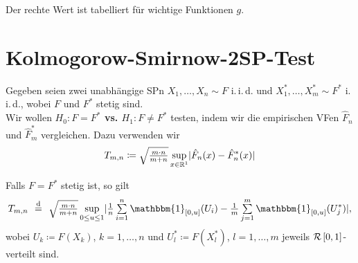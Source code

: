 \documentclass{cheat-sheet}
\newcommand{\E}{\mathbb{E}} %
\newcommand{\ind}{\mathbbm{1}} %
\DeclareMathOperator*{\eqqd}{\stackrel{d}{=}} %
\newcommand{\iid}{i.\,i.\,d.} %
\newcommand{\Uniform}{\mathcal{R}} %
\DeclareMathOperator{\var}{Var} %
\newcommand{\testh}[1]{\textcolor{TestColor}{\textbf{#1}}}
\newcommand{\Normal}{\mathcal{N}} %
\begin{document}
\begin{bem}
  Der rechte Wert ist tabelliert für wichtige Funktionen $g$.
\end{bem}

\section{Kolmogorow-Smirnow-2SP-Test}

\begin{situation}
  Gegeben seien zwei unabhängige SPn $X_1, \ldots, X_n \sim F$ \iid{} und $X_1^*, \ldots, X_m^* \sim F^*$ \iid{}, wobei $F$ und $F^*$ stetig sind. \\
  Wir wollen \testh{$H_0 : F = F^*$ vs. $H_1 : F \neq F^*$} testen, indem wir die empirischen VFen $\hat{F}_n$ und $\hat{F}_m^*$ vergleichen.
  Dazu verwenden wir
  \[ T_{m,n} \coloneqq \sqrt{\tfrac{m \cdot n}{m + n}} \sup_{x \in \mathbb{R}^1} \lvert\hat{F}_n(x) - \hat{F}_n^*(x)\rvert \]
\end{situation}

\begin{satz}
  Falls $F = F^*$ stetig ist, so gilt
  \[ T_{m,n} \enspace\eqqd\enspace \sqrt{\tfrac{m \cdot n}{m + n}} \sup_{0 \leq u \leq 1} \abs{\tfrac{1}{n} \sum_{i=1}^n \ind_{\cinterval{0}{u}} (U_i) - \tfrac{1}{m} \sum_{j=1}^m \ind_{\cinterval{0}{u}} (U_j^*)}, \]
  wobei $U_k \coloneqq F(X_k)$, $k = 1, \ldots, n$ und $U^*_l \coloneqq F(X^*_l)$, $l = 1, \ldots, m$ jeweils $\Uniform \cinterval{0}{1}$-verteilt sind.
  \iffalse
  wobei $X_i \eqqd F^{-}(U_i)$, $i = 1, \ldots, n$, \enspace
  $X_j^* \eqqd F^{*,-}(U_j^*)$, $j = 1, \ldots, m$ und
  \[
    F^{-}(t) \coloneqq \begin{cases}
      \min \Set{x \in \R^1}{F(x) \geq t} & 0 < t \leq 1, \\
      \lim_{t \downarrow 0} F^{-}(t) & t = 0.
    \end{cases}
    \tag{Quantilfunktion}
  \]
  \fi
\end{satz}

\iffalse
\begin{bem}
  Asymptotik von $T_{n,m}$ für $m, n \to \infty$
  \[
    X_{m,n}(u) \coloneqq \sqrt{\tfrac{m \cdot n}{m + n}} \left( \hat{G}_n(u) - \hat{G}^*_m(u) \right), \quad
    0 \leq u \leq 1.
  \]
  \[
    \E X_{m,n} = \sqrt{\tfrac{m \cdot n}{m + n}} \left( \E \ind_{\cinterval{0}{u}}(U_1) - \E \ind_{\cinterval{0}{u}}(U^*_1) \right) = 0
  \]
  \[
    \var(X_{m,n}) = \tfrac{m \cdot n}{m + n} \left( \E (\hat{G}_n(u))^2 + \E (\hat{G}_m(u))^2 - 2 \E \hat{G}^*_n(u) \cdot \E \hat{G}^*_m(u) \right)
  \]

  Genauso wie oben ergibt sich
  \[
    (X_{m,n}(u_1), \ldots, X_{m,n}(u_k)) \xra[n \to \infty]{d} \Normal_k(0, \Sigma)
    \quad \text{mit} \quad
    \Sigma_{ij} = u_i \wedge u_j - u_i \cdot u_j.
  \]

  Daraus folgt die schwache Konvergenz
  \[ X_{m,n}(\blank) \xra[n \to \infty]{d} \dot{B}(\blank) \]
  im Skorodoch-Raum $\mathcal{D} \cinterval{0}{1}$.
\end{bem}
\fi
\end{document}
